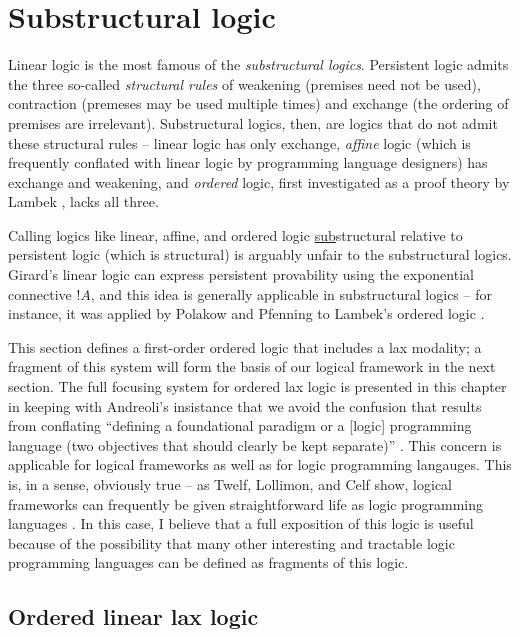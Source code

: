 \chapter{Substructural logic}

Linear logic is the most famous of the {\it substructural logics}.
Persistent logic admits the three so-called {\it structural rules} of
weakening (premises need not be used), contraction (premeses may be
used multiple times) and exchange (the ordering of premises are 
irrelevant). Substructural logics, then, are logics that do not admit
these structural rules -- linear logic has only exchange, 
{\it affine} logic (which is frequently conflated with linear logic
by programming language designers) has exchange and weakening, and
{\it ordered} logic, first investigated as a proof theory by Lambek
\cite{lambek58mathematics}, lacks all three. 

Calling logics like linear, affine, and ordered logic
\underline{sub}structural relative to persistent logic (which is
structural) is arguably unfair to the substructural logics. Girard's
linear logic can express persistent provability using the exponential
connective ${!}A$, and this idea is generally applicable in
substructural logics -- for instance, it was applied by Polakow and
Pfenning to Lambek's ordered logic
\cite{polakow99natural}. 

This section defines a first-order ordered logic that includes a lax
modality; a fragment of this system will form the basis of our logical
framework in the next section. The full focusing system for ordered
lax logic is presented in this chapter in keeping with Andreoli's
insistance that we avoid the confusion that results from conflating
``defining a foundational paradigm or a [logic] programming language
(two objectives that should clearly be kept separate)''
\cite{andreoli01focussing}. This concern is applicable for logical
frameworks as well as for logic programming langauges. This is, in a
sense, obviously true -- as Twelf, Lollimon, and Celf show, logical
frameworks can frequently be given straightforward life as logic
programming languages
\cite{pfenning99system,lopez05monadic,schacknielsen08celf}. In this
case, I believe that a full exposition of this logic is useful because
of the possibility that many other interesting and tractable logic
programming languages can be defined as fragments of this logic.

\section{Ordered linear lax logic}

